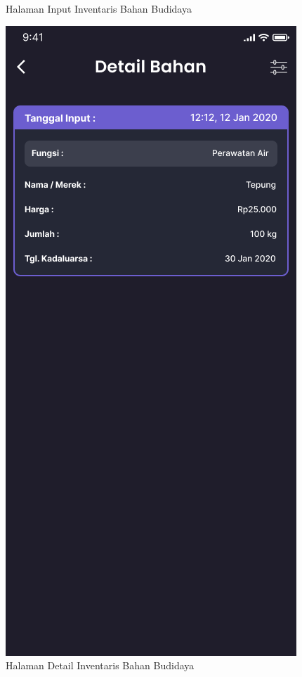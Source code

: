\begin{spacing}{1.5}
\begin{figure}[H]
			\caption{Halaman Input Inventaris Bahan Budidaya}
		\endminipage\hfill
			\includegraphics[width=\linewidth]{gambar/sprint1/mockup_list_materials.png}
			\caption{Halaman Detail Inventaris Bahan Budidaya}
		\endminipage
	\end{figure}


\end{spacing}
